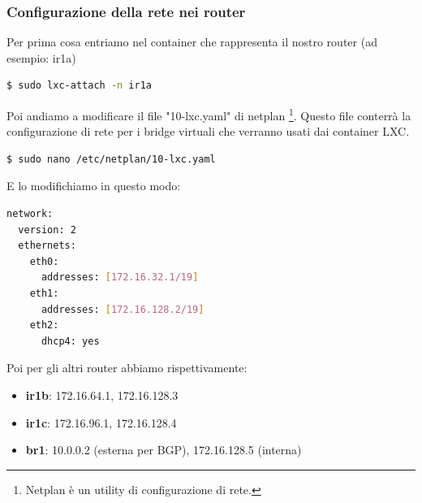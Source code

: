 \documentclass[12pt,a4paper,twoside]{book}
\begin{document}
\subsubsection{Configurazione della rete nei router}
Per prima cosa entriamo nel container che rappresenta il nostro router (ad esempio: ir1a)
\begin{lstlisting}[language=bash]
$ sudo lxc-attach -n ir1a
\end{lstlisting}
Poi andiamo a modificare il file "10-lxc.yaml" di netplan \footnote{Netplan è un utility di configurazione di rete.}. Questo file conterrà la configurazione di rete per i bridge virtuali che verranno usati dai container \ac{LXC}.
\begin{lstlisting}[language=bash]
$ sudo nano /etc/netplan/10-lxc.yaml
\end{lstlisting}
E lo modifichiamo in questo modo:
\begin{lstlisting}[language=bash]
network:
  version: 2
  ethernets:
    eth0:
      addresses: [172.16.32.1/19]
    eth1:
      addresses: [172.16.128.2/19]
    eth2:
      dhcp4: yes
\end{lstlisting}
Poi per gli altri router abbiamo rispettivamente:
\begin{itemize}
    \item \textbf{ir1b}: 172.16.64.1, 172.16.128.3
    \item \textbf{ir1c}: 172.16.96.1, 172.16.128.4
    \item \textbf{br1}: 10.0.0.2 (esterna per \ac{BGP}), 172.16.128.5 (interna)
\end{itemize}
\end{document}
